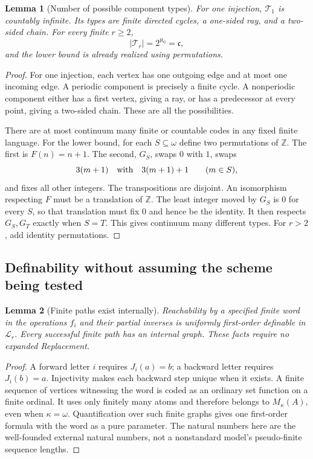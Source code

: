 \documentclass[11pt,letterpaper]{article}
\numberwithin{equation}{section}
\theoremstyle{plain}
\newtheorem{lemma}[lemma]{Lemma}
\theoremstyle{definition}
\theoremstyle{remark}
\newcommand{\cont}{\mathfrak c}
\newcommand{\Langr}{\mathcal L_r}
\begin{document}
\begin{lemma}[Number of possible component types]\label{nee:lem:typecount}
For one injection, $\mathcal T_1$ is countably infinite. Its types are finite directed cycles, a one-sided ray, and a two-sided chain. For every finite $r\geq2$,
\[
|\mathcal T_r|=2^{\aleph_0}=\cont,
\]
and the lower bound is already realized using permutations.
\end{lemma}
\begin{proof}
For one injection, each vertex has one outgoing edge and at most one incoming edge. A periodic component is precisely a finite cycle. A nonperiodic component either has a first vertex, giving a ray, or has a predecessor at every point, giving a two-sided chain. These are all the possibilities.

There are at most continuum many finite or countable codes in any fixed finite language. For the lower bound, for each $S\subseteq\omega$ define two permutations of $\mathbb Z$. The first is $F(n)=n+1$. The second, $G_S$, swaps $0$ with $1$, swaps
\begin{equation}\label{nee:eq:marker}
3(m+1)\quad\hbox{with}\quad3(m+1)+1\qquad(m\in S),
\end{equation}
and fixes all other integers. The transpositions are disjoint. An isomorphism respecting $F$ must be a translation of $\mathbb Z$. The least integer moved by $G_S$ is $0$ for every $S$, so that translation must fix $0$ and hence be the identity. It then respects $G_S,G_T$ exactly when $S=T$. This gives continuum many different types. For $r>2$, add identity permutations.
\end{proof}

\subsection{Definability without assuming the scheme being tested}
\begin{lemma}[Finite paths exist internally]\label{nee:lem:paths}
Reachability by a specified finite word in the operations $f_i$ and their partial inverses is uniformly first-order definable in $\Langr$. Every successful finite path has an internal graph. These facts require no expanded Replacement.
\end{lemma}
\begin{proof}
A forward letter $i$ requires $J_i(a)=b$; a backward letter requires $J_i(b)=a$. Injectivity makes each backward step unique when it exists. A finite sequence of vertices witnessing the word is coded as an ordinary set function on a finite ordinal. It uses only finitely many atoms and therefore belongs to $M_\kappa(A)$, even when $\kappa=\omega$. Quantification over such finite graphs gives one first-order formula with the word as a pure parameter. The natural numbers here are the well-founded external natural numbers, not a nonstandard model's pseudo-finite sequence lengths.
\end{proof}
\end{document}
